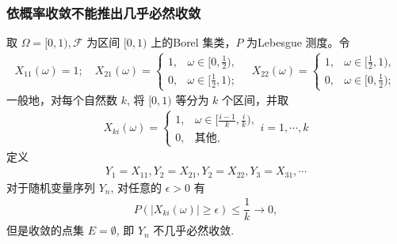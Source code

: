 \begin{frame}
	\frametitle{依概率收敛不能推出几乎必然收敛}
	\begin{exam}
		取 $\Omega=[0,1), \mathcal{F}$ 为区间 $[0,1)$ 上的{\rm Borel} 集类，$P$ 为{\rm Lebesgue} 测度。令
		\begin{eqnarray*}
			X_{11}(\omega)=1; \quad
			X_{21}(\omega)=\left\{
			\begin{array}{ll}
				1, &\omega\in [0,\frac{1}{2}),\\
				0, &\omega\in [\frac{1}{2},1);
			\end{array}
			\right.\quad
			X_{22}(\omega)=\left\{
			\begin{array}{ll}
				1, &\omega\in [\frac{1}{2},1),\\
				0, &\omega\in [0,\frac{1}{2});
			\end{array}
			\right.
		\end{eqnarray*}
		一般地，对每个自然数 $k$, 将 $[0,1)$ 等分为 $k$ 个区间，并取
		\begin{eqnarray*}
			X_{ki}(\omega)=\left\{
			\begin{array}{ll}
				1, &\omega\in [\frac{i-1}{k},\frac{i}{k}),\\
				0, &\mbox{其他},
			\end{array}
			\right. i=1,\cdots, k
		\end{eqnarray*}
		定义
		\begin{eqnarray*}
			Y_1=X_{11}, Y_2=X_{21}, Y_2=X_{22}, Y_3=X_{31}, \cdots
		\end{eqnarray*}
		对于随机变量序列 $Y_n$, 对任意的 $\epsilon>0$ 有
		\begin{eqnarray*}
			P(|X_{ki}(\omega)|\geq \epsilon)\leq \dfrac{1}{k}\rightarrow 0,
		\end{eqnarray*}
		但是收敛的点集 $E=\emptyset$, 即 $Y_n$ 不几乎必然收敛.
	\end{exam}

\end{frame}

